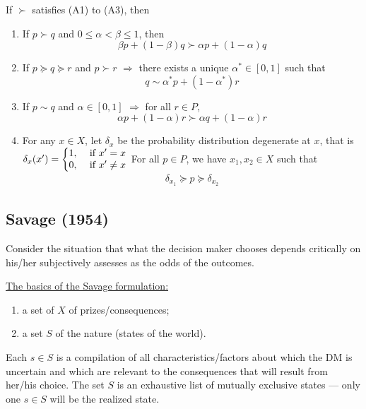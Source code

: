 \documentclass[11pt]{elegantbook}
\begin{document}
\begin{lemma}
    If $\succ$ satisfies (A1) to (A3), then
    \begin{enumerate}[(L1).]
        \item If $p\succ q$ and $0\leq\alpha<\beta\leq 1$, then $$\beta p+(1-\beta)q\succ \alpha p+(1-\alpha)q$$
        \item If $p\succeq q\succeq r$ and $p\succ r$ $\Rightarrow$ there exists a unique $\alpha^*\in[0,1]$ such that $$q\sim \alpha^*p+(1-\alpha^*)r$$
        \item If $p\sim q$ and $\alpha\in[0,1]$ $\Rightarrow$ for all $r\in P$, $$\alpha p+(1-\alpha)r\succ \alpha q+(1-\alpha)r$$
        \item For any $x\in X$, let $\delta_x$ be the probability distribution degenerate at $x$, that is $\delta_x(x')=\left\{\begin{matrix}
            1,&\textnormal{ if }x'=x\\
            0,&\textnormal{ if }x'\neq x
        \end{matrix}\right.$ For all $p\in P$, we have $x_1,x_2\in X$ such that
        \begin{equation}
            \begin{aligned}
                \delta_{x_1}\succeq p\succeq \delta_{x_2}
            \end{aligned}
            \nonumber
        \end{equation}
    \end{enumerate}
\end{lemma}

\subsection{Savage (1954)}
Consider the situation that what the decision maker chooses depends critically on his/her subjectively assesses as the odds of the outcomes.

\underline{The basics of the Savage formulation:}
\begin{enumerate}[$\circ$]
    \item a set of $X$ of prizes/consequences;
    \item a set $S$ of the nature (states of the world).
\end{enumerate}
Each $s\in S$ is a compilation of all characteristics/factors about which the DM is uncertain and which are relevant to the consequences that will
result from her/his choice. The set $S$ is an exhaustive list of mutually exclusive states — only one
$s\in S$ will be the realized state.
\end{document}

